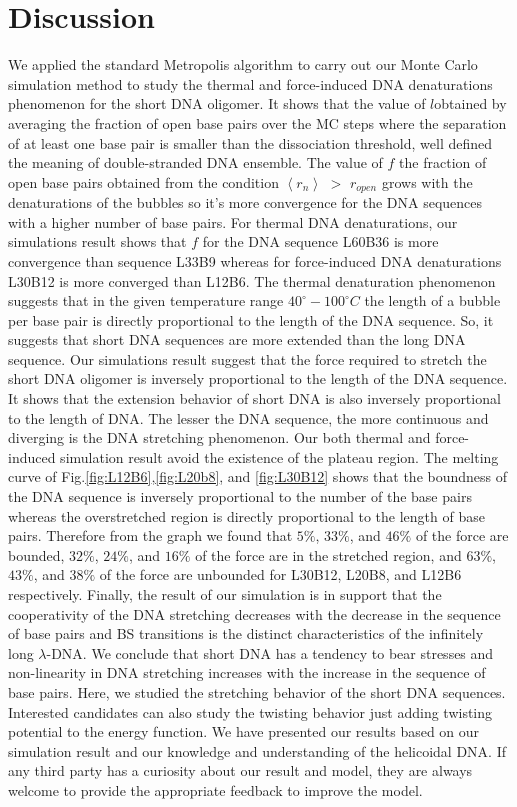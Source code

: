 \documentclass[12pt,masters,final]{UTRGVthesis}
\begin{document}
\section{Discussion}
 We applied the standard Metropolis algorithm to carry out our Monte Carlo simulation method to 
study the thermal and force-induced DNA denaturations phenomenon for the short DNA oligomer. It shows that the value of $l$obtained by averaging the fraction of open base pairs over the MC steps where the separation of at least one base pair is smaller than the dissociation threshold, well defined the meaning of double-stranded DNA ensemble. The value of  $f $ the fraction of open base pairs obtained from the condition $\left< r_{n}\right>$ $>$ $r_{open}$ grows with the denaturations of the bubbles so it's more convergence for the DNA sequences with a higher number of base pairs. For thermal DNA denaturations, our simulations result shows that $f$ for the DNA sequence L60B36 is more convergence than sequence L33B9 whereas for force-induced DNA denaturations L30B12 is more converged than L12B6. The thermal denaturation phenomenon suggests that in the given temperature range $40^\circ-100^\circ C$ the length of a bubble per base pair is directly proportional to the length of the DNA sequence. So, it suggests that short DNA sequences are more extended than the long DNA sequence. Our simulations result suggest that the force required to stretch the short DNA oligomer is inversely proportional to the length of the DNA sequence. It shows that the extension behavior of short DNA is also inversely proportional to the length of DNA. The lesser the DNA sequence, the more continuous and diverging is the DNA stretching phenomenon. Our both thermal and force-induced simulation result avoid the existence of the plateau region. The melting curve of Fig.\ref{fig:L12B6},\ref{fig:L20b8}, and \ref{fig:L30B12} shows that the boundness of the DNA sequence is inversely proportional to the number of the base pairs whereas the overstretched region is directly proportional to the length of base pairs. Therefore from the graph we found that $5\%$, $33\%$, and $46\%$ of the force are bounded, $32\%$, $24\%$, and $16\%$  of the force are in the stretched region, and $63\%$, $43\%$, and $38\%$  of the force are unbounded for L30B12, L20B8, and L12B6 respectively. Finally, the result of our simulation is in support that the cooperativity of the DNA stretching decreases with the decrease in the sequence of base pairs and BS transitions is the distinct characteristics of the infinitely long $\lambda$-DNA. We conclude that short DNA has a tendency to bear stresses and non-linearity in DNA stretching increases with the increase in the sequence of base pairs. Here, we studied the stretching behavior of the short DNA sequences. Interested candidates can also study the twisting behavior just adding twisting potential to the energy function. We have presented our results based on our simulation result and our knowledge and understanding of the helicoidal DNA. If any third party has a curiosity about our result and model, they are always welcome to provide the appropriate feedback to improve the model.
\newpage


\biographypage
\end{document}
